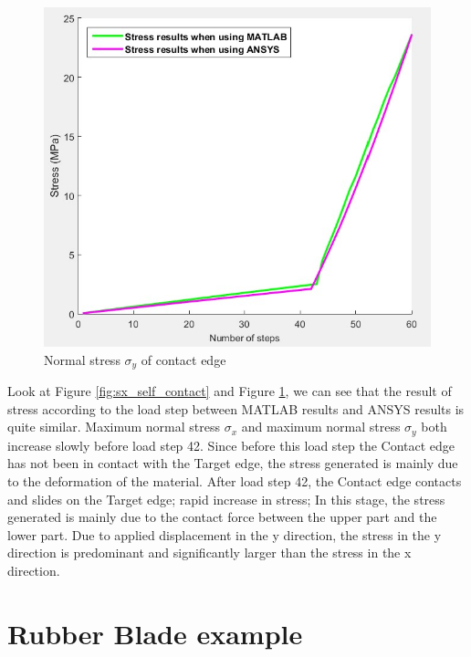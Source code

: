 \begin{figure}[H]
    \centering
    \includegraphics[scale=0.5]{Figures/sy_self_contact.jpg}
    \decoRule
    \caption{Normal stress $\sigma_y$ of contact edge}
    \label{fig:sy_self_contact}
\end{figure} \noindent
Look at Figure \ref{fig:sx_self_contact} and Figure \ref{fig:sy_self_contact},
we can see that the result of stress according to the load step 
between MATLAB results and ANSYS results is quite similar. Maximum normal stress $\sigma_x$ and maximum normal stress $\sigma_y$ both increase slowly before load step 42.
Since before this load step the Contact edge has not been in contact with the Target edge, the stress generated is mainly due to the deformation of the material.
After load step 42, the Contact edge contacts and slides on the Target edge; rapid increase in stress; In this stage, the stress generated is mainly due to the contact force between the upper part and the lower part.
Due to applied displacement in the y direction, the stress in the y direction is predominant and significantly larger than the stress in the x direction. 
\section{Rubber Blade example}
